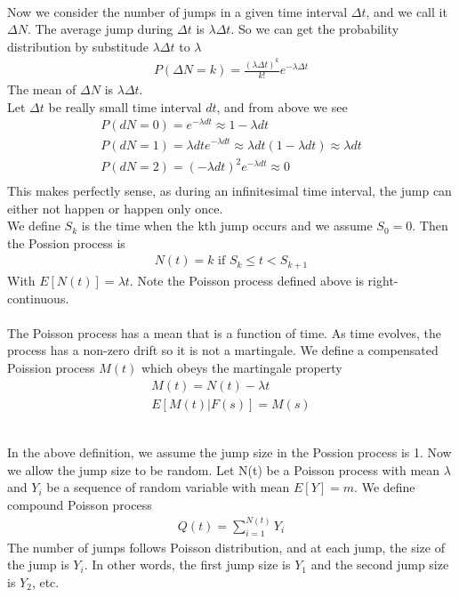 \documentclass[a4paper]{article}
\begin{document}
\\
Now we consider the number of jumps in a given time interval $\Delta t$, and we call it $\Delta N$. The average jump during $\Delta t$ is $\lambda \Delta t$. So we can get the probability distribution by substitude $\lambda \Delta t$ to $\lambda$
\begin{align*}
	P(\Delta N = k) = \frac{(\lambda \Delta t)^k}{k!}e^{-\lambda \Delta t}
\end{align*}
The mean of $\Delta N$ is $\lambda \Delta t$.\\

Let $\Delta t$ be really small time interval $dt$, and from above we see
\begin{align*}
	P(dN = 0) = e^{-\lambda dt} \approx 1 - \lambda dt \\
	P(dN = 1) = \lambda dt e^{-\lambda dt} \approx \lambda dt (1 - \lambda dt) \approx \lambda dt \\
	P(dN = 2) = (-\lambda dt)^2 e^{- \lambda dt} \approx 0 \\
\end{align*}
This makes perfectly sense, as during an infinitesimal time interval, the jump can either not happen or happen only once.\\

We define $S_k$ is the time when the kth jump occurs and we assume $S_0 = 0$. Then the Possion process is
\begin{align*}
	N(t) = k  \text{ if } S_k \leq t < S_{k+1}
\end{align*}
With $E[N(t)] = \lambda t$.
Note the Poisson process defined above is right-continuous.\\

\\
The Poisson process has a mean that is a function of time. As time evolves, the process has a non-zero drift so it is not a martingale. We define a compensated Poission process $M(t)$ which obeys the martingale property
\begin{align*}
	M(t) = N(t) - \lambda t \\
	E[M(t)|F(s)] = M(s)
\end{align*}

\\
In the above definition, we assume the jump size in the Possion process is 1. Now we allow the jump size to be random. Let N(t) be a Poisson process with mean $\lambda$ and $Y_i$ be a sequence of random variable with mean $E[Y] = m$. We define compound Poisson process
\begin{align*}
	Q(t) = \sum_{i=1}^{N(t)} Y_i
\end{align*}
The number of jumps follows Poisson distribution, and at each jump, the size of the jump is $Y_i$. In other words, the first jump size is $Y_1$ and the second jump size is $Y_2$, etc.
\end{document}
